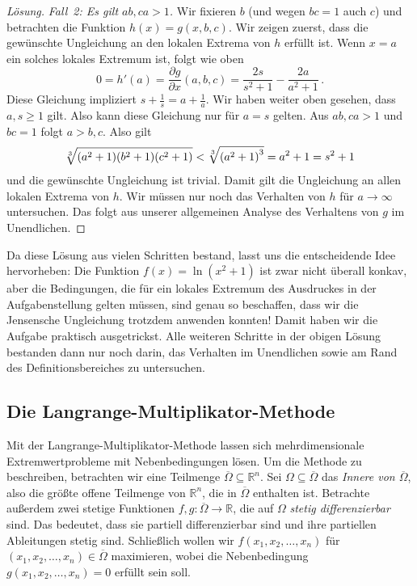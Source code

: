 \begin{proof}[Lösung]
	\emph{Fall~2: Es gilt $ab,ca>1$.} Wir fixieren $b$ (und wegen $bc=1$ auch $c$) und betrachten die Funktion $h(x)=g(x,b,c)$. Wir zeigen zuerst, dass die gewünschte Ungleichung an den lokalen Extrema von $h$ erfüllt ist. Wenn $x=a$ ein solches lokales Extremum ist, folgt wie oben
	\begin{equation*}
		0=h'(a)=\frac{\partial g}{\partial x}(a,b,c)=\frac{2s}{s^2+1}-\frac{2a}{a^2+1}\,.
	\end{equation*}
	Diese Gleichung impliziert $s+\frac1s=a+\frac1a$. Wir haben weiter oben gesehen, dass $a,s\geqslant 1$ gilt. Also kann diese Gleichung nur für $a=s$ gelten. Aus $ab,ca>1$ und $bc=1$ folgt $a>b,c$. Also gilt
	\begin{equation*}
		\sqrt[3]{\parens*{a^2+1}\parens*{b^2+1}\parens*{c^2+1}}<\sqrt[3]{\parens*{a^2+1}^3}=a^2+1=s^2+1
	\end{equation*}
	und die gewünschte Ungleichung ist trivial. Damit gilt die Ungleichung an allen lokalen Extrema von $h$. Wir müssen nur noch das Verhalten von $h$ für $a\rightarrow \infty$ untersuchen. Das folgt aus unserer allgemeinen Analyse des Verhaltens von $g$ im Unendlichen.
\end{proof}

Da diese Lösung aus vielen Schritten bestand, lasst uns die entscheidende Idee hervorheben: Die Funktion $f(x)=\ln(x^2+1)$ ist zwar nicht überall konkav, aber die Bedingungen, die für ein lokales Extremum des Ausdruckes in der Aufgabenstellung gelten müssen, sind genau so beschaffen, dass wir die Jensensche Ungleichung trotzdem anwenden konnten! Damit haben wir die Aufgabe praktisch ausgetrickst. Alle weiteren Schritte in der obigen Lösung bestanden dann nur noch darin, das Verhalten im Unendlichen sowie am Rand des Definitionsbereiches zu untersuchen.

\subsection*{Die Langrange-Multiplikator-Methode}
Mit der Langrange-Multiplikator-Methode lassen sich mehrdimensionale Extremwertprobleme mit Nebenbedingungen lösen. Um die Methode zu beschreiben, betrachten wir eine Teilmenge $\overline{\Omega}\subseteq \mathbb R^n$. Sei $\Omega\subseteq \overline{\Omega}$ das \emph{Innere von $\overline{\Omega}$}, also die größte offene Teilmenge von $\mathbb R^n$, die in $\overline{\Omega}$ enthalten ist. Betrachte außerdem zwei stetige Funktionen $f,g\colon \overline{\Omega}\rightarrow \mathbb R$, die auf $\Omega$ \emph{stetig differenzierbar} sind. Das bedeutet, dass sie partiell differenzierbar sind und ihre partiellen Ableitungen stetig sind. Schließlich wollen wir $f(x_1,x_2,\dotsc,x_n)$ für $(x_1,x_2,\dotsc,x_n)\in\overline{\Omega}$ maximieren, wobei die Nebenbedingung $g(x_1,x_2,\dotsc,x_n)=0$ erfüllt sein soll.

